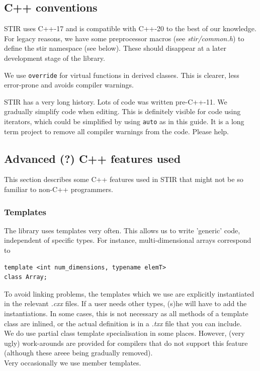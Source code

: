 \documentclass{article}
\begin{document}
\subsection{C++ conventions}
STIR uses C++-17 and is compatible with C++-20 to the best of our knowledge.
For legacy reasons, we have some preprocessor 
macros (see \textit{stir/common.h}) to define the stir namespace (see below).
These should disappear at a 
later development stage of the library.

We use \texttt{override} for virtual functions in derived classes. This is clearer,
less error-prone and avoids compiler warnings.

STIR has a very long history. Lots of code was written pre-C++-11. We gradually simplify
code when editing. This is definitely visible for code using iterators, which could be
simplified by using \texttt{auto} as in this guide. It is a long term project to
remove all compiler warnings from the code. Please help.

\subsection{\label{ssect:AdvancedCppFeatures}
Advanced (?) C++ features used}


This section describes some C++ features used in STIR that might not be so familiar to
non-C++ programmers.

\subsubsection{Templates}
The library uses templates very often. This allows us to write 
'generic' code, independent of specific types. For instance, 
multi-dimensional arrays correspond to 

\begin{verbatim}
template <int num_dimensions, typename elemT>
class Array;
\end{verbatim}


To avoid linking problems, the templates which we use are explicitly 
instantiated in the relevant \textit{.cxx} files. If a user needs 
other types, (s)he will have to add the instantiations. In some cases,
this is not necessary as all methods of a template class are inlined, or the
actual definition is in a \textit{.txx} file that you can include.\\
We do use partial class template specialisation in some places. 
However, (very ugly) work-arounds are provided for compilers 
that do not support this feature (although these areee being gradually removed).\\
Very occasionally we use member templates. 
\end{document}

